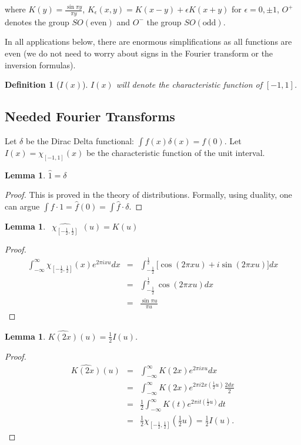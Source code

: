 \documentclass{compositio}
\newcommand\bp{\begin{proof}}
\newcommand\ep{\end{proof}}
\newtheorem{lem}[thm]{Lemma}
\newtheorem{defi}[thm]{Definition}
\newcommand{\foh}{\frac{1}{2}}  %
\newcommand{\chiint}{\chi_{[-\foh,\foh]}}
\newcommand{\kkot}[1]{ \frac{\sin \pi {#1} }{\pi {#1} } }
\begin{document}
where $K(y) = \kkot{y}$, $ K_\epsilon(x,y) = K(x-y) + \epsilon
K(x+y)$ for $\epsilon = 0, \pm 1$, $O^+$ denotes the group
$SO(\mbox{even})$ and $O^-$ the group $SO(\mbox{odd})$.

In all applications below, there are enormous simplifications as
all functions are even (we do not need to worry about signs in the
Fourier transform or the inversion formulas).

\begin{defi}[$I(x)$] $I(x)$ will denote the characteristic
function of $[-1,1]$. \end{defi}

\subsection{Needed Fourier Transforms}

Let $\delta$ be the Dirac Delta functional: $\int f(x) \delta(x) =
f(0)$. Let $I(x) = \chi_{[-1,1]}(x)$ be the characteristic
function of the unit interval.

\begin{lem}$\widehat{1} = \delta$
\end{lem}

\bp This is proved in the theory of distributions. Formally, using
duality, one can argue $\int f \cdot 1 = \widehat{f}(0) = \int
\widehat{f} \cdot \delta$. \ep

\begin{lem}$\widehat{\ \ \chiint \ \ }(u) = K(u)$
\end{lem}

\bp
\begin{eqnarray}
\int_{-\infty}^{\infty} \chiint(x) e^{2\pi i xu} dx & = &
\int_{-\foh}^{\foh} \Big[\cos (2\pi xu) + i \sin (2 \pi xu) \Big]
dx \nonumber\\ & = & \int_{-\foh}^{\foh} \cos (2\pi xu) dx
\nonumber\\ & = & \frac{\sin \pi u}{\pi u}
\end{eqnarray} \ep

\begin{lem}$\widehat{K(2x)}(u) = \foh I(u)$.
\end{lem}

\bp
\begin{eqnarray}
\widehat{K(2x)}(u) & = & \int_{-\infty}^{\infty} K(2x) e^{2 \pi i
x u} dx \nonumber\\ & = & \int_{-\infty}^{\infty} K(2x) e^{2 \pi i
2x (\foh u)} \frac{2dx}{2} \nonumber\\ & = & \foh
\int_{-\infty}^{\infty} K(t) e^{2 \pi i t (\foh u)} dt \nonumber\\
& = & \foh \chiint\left(\foh u\right) = \foh I(u).
\end{eqnarray} \ep
\end{document}

